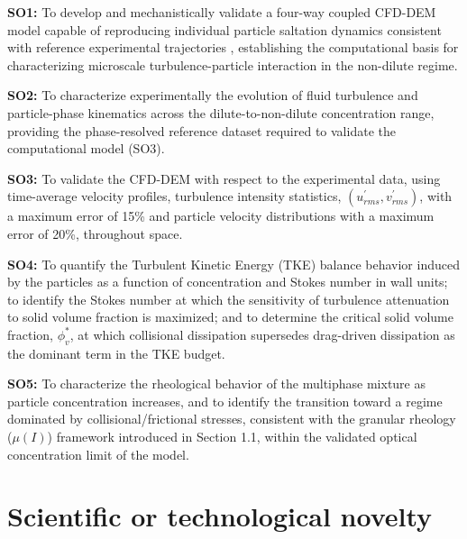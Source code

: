 \textbf{SO1:} To develop and mechanistically validate a four-way coupled CFD-DEM model capable of reproducing individual particle saltation dynamics consistent with reference experimental trajectories \cite{PEND_Nio1998}, establishing the computational basis for characterizing microscale turbulence-particle interaction in the non-dilute regime.

\textbf{SO2:} To characterize experimentally the evolution of fluid turbulence and particle-phase kinematics across the dilute-to-non-dilute concentration range, providing the phase-resolved reference dataset required to validate the computational model (SO3).

\textbf{SO3:} To validate the CFD-DEM with respect to the experimental data, using time-average velocity profiles, turbulence intensity statistics, \((u_{rms}^{'},v_{rms}^{'})\), with a maximum error of 15\% and particle velocity distributions with a maximum error of 20\%, throughout space.

\textbf{SO4:} To quantify the Turbulent Kinetic Energy (TKE) balance behavior induced by the particles as a function of concentration and Stokes number in wall units; to identify the Stokes number at which the sensitivity of turbulence attenuation to solid volume fraction is maximized; and to determine the critical solid volume fraction, \(\phi_{v}^{*}\), at which collisional dissipation supersedes drag-driven dissipation as the dominant term in the TKE budget.

\textbf{SO5:} To characterize the rheological behavior of the multiphase mixture as particle concentration increases, and to identify the transition toward a regime dominated by collisional/frictional stresses, consistent with the granular rheology (\(\mu(I)\)) framework introduced in Section 1.1, within the validated optical concentration limit of the model.

\hypertarget{scientific-or-technological-novelty}{%
\section{Scientific or technological novelty}\label{scientific-or-technological-novelty}}

